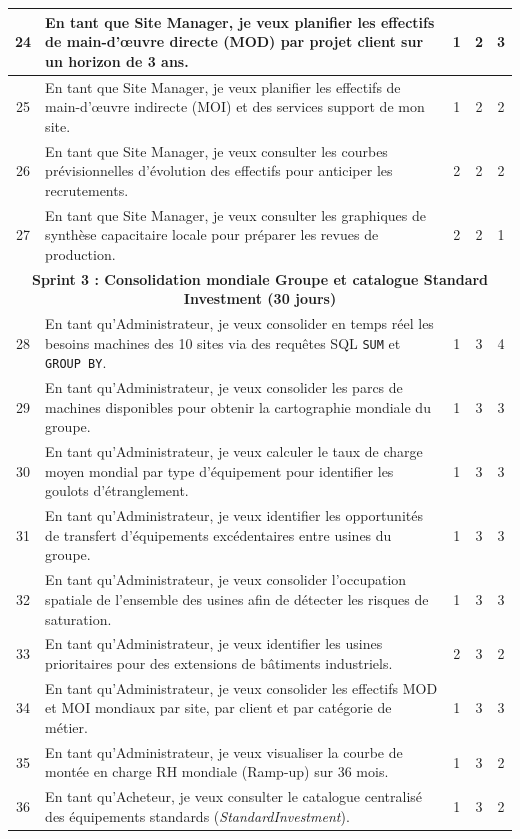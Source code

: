\begin{longtable}{|c|p{8.8cm}|c|c|c|}
24 & En tant que Site Manager, je veux planifier les effectifs de main-d'œuvre directe (MOD) par projet client sur un horizon de 3 ans. & 1 & 2 & 3 \\ \hline
25 & En tant que Site Manager, je veux planifier les effectifs de main-d'œuvre indirecte (MOI) et des services support de mon site. & 1 & 2 & 2 \\ \hline
26 & En tant que Site Manager, je veux consulter les courbes prévisionnelles d'évolution des effectifs pour anticiper les recrutements. & 2 & 2 & 2 \\ \hline
27 & En tant que Site Manager, je veux consulter les graphiques de synthèse capacitaire locale pour préparer les revues de production. & 2 & 2 & 1 \\ \hline
\multicolumn{5}{|c|}{\textbf{Sprint 3 : Consolidation mondiale Groupe et catalogue Standard Investment (30 jours)}} \\ \hline
28 & En tant qu'Administrateur, je veux consolider en temps réel les besoins machines des 10 sites via des requêtes SQL \texttt{SUM} et \texttt{GROUP BY}. & 1 & 3 & 4 \\ \hline
29 & En tant qu'Administrateur, je veux consolider les parcs de machines disponibles pour obtenir la cartographie mondiale du groupe. & 1 & 3 & 3 \\ \hline
30 & En tant qu'Administrateur, je veux calculer le taux de charge moyen mondial par type d'équipement pour identifier les goulots d'étranglement. & 1 & 3 & 3 \\ \hline
31 & En tant qu'Administrateur, je veux identifier les opportunités de transfert d'équipements excédentaires entre usines du groupe. & 1 & 3 & 3 \\ \hline
32 & En tant qu'Administrateur, je veux consolider l'occupation spatiale de l'ensemble des usines afin de détecter les risques de saturation. & 1 & 3 & 3 \\ \hline
33 & En tant qu'Administrateur, je veux identifier les usines prioritaires pour des extensions de bâtiments industriels. & 2 & 3 & 2 \\ \hline
34 & En tant qu'Administrateur, je veux consolider les effectifs MOD et MOI mondiaux par site, par client et par catégorie de métier. & 1 & 3 & 3 \\ \hline
35 & En tant qu'Administrateur, je veux visualiser la courbe de montée en charge RH mondiale (Ramp-up) sur 36 mois. & 1 & 3 & 2 \\ \hline
36 & En tant qu'Acheteur, je veux consulter le catalogue centralisé des équipements standards (\textit{StandardInvestment}). & 1 & 3 & 2 \\ \hline

\end{longtable}
